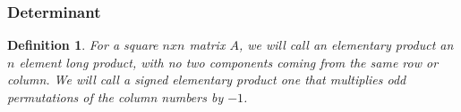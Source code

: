 \documentclass{beamer}
\newtheorem{defn}{Definition}
\numberwithin{equation}{section}
\begin{document}
\begin{frame}
\frametitle{Determinant}

\begin{defn}
For a square $n x n$ matrix $A$, we will call an \alert{elementary product} an $n$ element long product, with no two components coming from the same row or column.  We will call a \alert{signed} elementary product one that multiplies odd permutations of the column numbers by $-1$.  
\end{defn}


\vspace{1in}

\pause 

\pause 





\end{frame}
\end{document}
